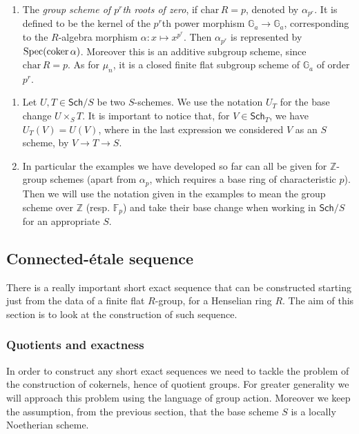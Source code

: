 \begin{ex}
\begin{enumerate}
		\item The \emph{group scheme of $p^r$th roots of zero},
			if $\mathrm{char}\, R = p$, denoted by $\alpha_{p^r}$. 
			It is defined to be the kernel of the $p^r$th power
			morphism $\mathbb{G}_a \to \mathbb{G}_a$,
			corresponding to the $R$-algebra morphism
			$\alpha\colon x \mapsto x^{p^r}$.
			Then $\alpha_{p^r}$ is represented by $\operatorname{Spec}(\operatorname{coker} \alpha)$.
			Moreover this is an additive subgroup scheme, since $\mathrm{char}\, R = p$.
			As for $\mu_n$, it is a closed finite flat subgroup scheme of 
			$\mathbb{G}_a$ of order \(p^r\).
	\end{enumerate}
\end{ex}


\begin{rem}\leavevmode\vspace{-0.2\baselineskip}
\begin{enumerate}
\item 	Let $U, T \in \mathsf{Sch}/S$ be two $S$-schemes.
	We use the notation $U_T$ for the base change $U \times_{ S } T$.
	It is important to notice that, for $V \in \mathsf{Sch}_{ T }$, we 
	have $U_T(V) = U(V)$, where in the last expression
	we considered $V$ as an $S$ scheme, by $V \to T \to S$.


\item	In particular the examples we have developed so far 
	can all be given for $\mathbb{Z}$-group schemes
	(apart from $\alpha_p$, which requires a base ring
	of characteristic $p$).
	Then we will use the notation given in the examples
	to mean the group scheme over $\mathbb{Z}$ (resp$.$ $\mathbb{F}_{p}$)
	and take their base change when working in $\mathsf{Sch}/S$
	for an appropriate $S$.
\end{enumerate}
\end{rem}


\subsection{Connected-étale sequence}
There is a really important short exact sequence that can be 
constructed starting just from the data of a finite flat
\(R\)-group, for a Henselian ring \(R\).
The aim of this section is to look at the construction 
of such sequence.



\subsubsection{Quotients and exactness}
In order to construct any short exact sequences
we need to tackle the problem of the construction
of cokernels, hence of quotient groups.
For greater generality we will approach this problem
using the language of group action.
Moreover we keep the assumption, from the previous section, that 
the base scheme $S$ is a locally Noetherian scheme.

